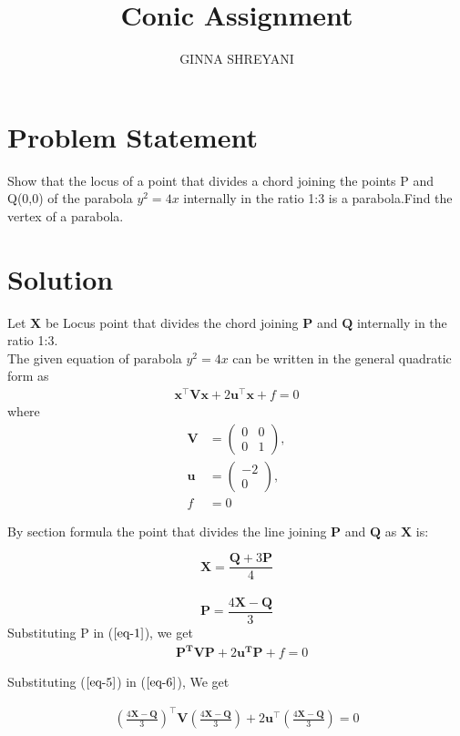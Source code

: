 \documentclass[journal,10pt,twocolumn]{article}
\title{
Conic Assignment
}
\author{GINNA SHREYANI}
\newcommand{\myvec}[1]{\ensuremath{\begin{pmatrix}#1\end{pmatrix}}}
\let\vec\mathbf
\let\vec\mathbf
\begin{document}
\maketitle
\tableofcontents
\bigskip
\section{Problem Statement}
Show that the locus of a point that divides a chord joining the points P and Q(0,0) of the parabola $y^2 = 4x$ internally in the ratio 1:3 is a parabola.Find the vertex of a parabola.\\
\section{Solution}
Let $\vec{X}$ be Locus point that divides the chord joining  $\vec{P}$ and $\vec{Q}$ internally in the ratio 1:3.  \\


The given equation of parabola $y^2 = 4x$ can be written in the general quadratic form as
\begin{align}
    \vec{x}^{\top}\vec{V}\vec{x}+2\vec{u}^{\top}\vec{x}+f=0
    \label{eq-1}
\end{align}
where
\begin{align}
	\label{eq:V_matrix}
	\vec{V} &= \myvec{0 & 0\\0 & 1},\\
	\label{eq:u_vector}
	\vec{u} &= \myvec{-2\\0},\\
	\label{eq:f_value}
	f &= 0
\end{align}

By section formula the point that divides the  line joining $\vec{P}$ and $\vec{Q}$ as $\vec{X}$ is:
 
\begin{equation}
	\vec{X}=\frac{\vec{Q}+3\vec{P}}{4}
	 \label{eq-4}
\end{equation}
\\
 \begin{equation}
	\vec{P}=\frac{4\vec{X}-\vec{Q}}{3}
	 \label{eq-5}
\end{equation}
Substituting P in ($\ref{eq-1}$), we get
\begin{align}
&\vec{P^T}\vec{V}\vec{P}+2\vec{u^T}\vec{P}+f = 0
\label{eq-6}
\end{align}

Substituting ($\ref{eq-5}$) in ($\ref{eq-6}$), We get 

\begin{multline}
    (\frac{4\vec{X}-\vec{Q}}{3})^{\top}\vec{V}(\frac{4\vec{X}-\vec{Q}}{3})+2\vec{u}^{\top}(\frac{4\vec{X}-\vec{Q}}{3})=0
     \label{eq-8}
    \end{multline}
\end{document}
